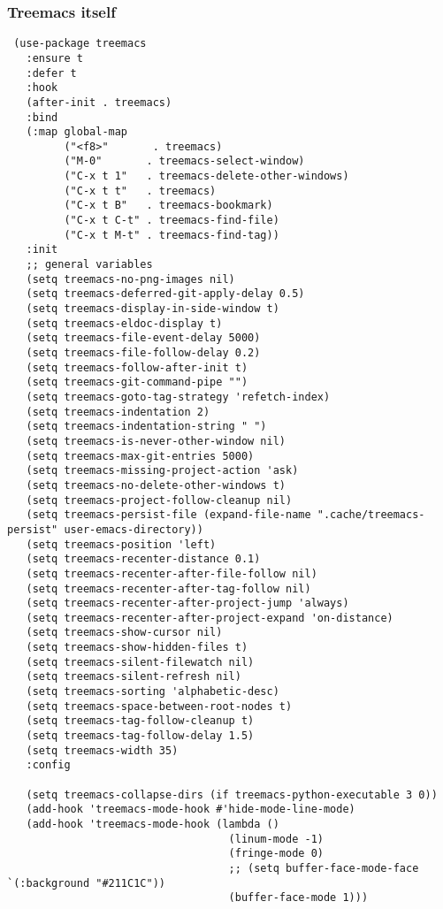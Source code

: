 \documentclass[11pt]{article}
\begin{document}
\subsubsection*{Treemacs itself}
\label{sec:orgd23273f}
\begin{verbatim}
 (use-package treemacs
   :ensure t
   :defer t
   :hook
   (after-init . treemacs)
   :bind
   (:map global-map
         ("<f8>"       . treemacs)
         ("M-0"       . treemacs-select-window)
         ("C-x t 1"   . treemacs-delete-other-windows)
         ("C-x t t"   . treemacs)
         ("C-x t B"   . treemacs-bookmark)
         ("C-x t C-t" . treemacs-find-file)
         ("C-x t M-t" . treemacs-find-tag))
   :init
   ;; general variables
   (setq treemacs-no-png-images nil)
   (setq treemacs-deferred-git-apply-delay 0.5)
   (setq treemacs-display-in-side-window t)
   (setq treemacs-eldoc-display t)
   (setq treemacs-file-event-delay 5000)
   (setq treemacs-file-follow-delay 0.2)
   (setq treemacs-follow-after-init t)
   (setq treemacs-git-command-pipe "")
   (setq treemacs-goto-tag-strategy 'refetch-index)
   (setq treemacs-indentation 2)
   (setq treemacs-indentation-string " ")
   (setq treemacs-is-never-other-window nil)
   (setq treemacs-max-git-entries 5000)
   (setq treemacs-missing-project-action 'ask)
   (setq treemacs-no-delete-other-windows t)
   (setq treemacs-project-follow-cleanup nil)
   (setq treemacs-persist-file (expand-file-name ".cache/treemacs-persist" user-emacs-directory))
   (setq treemacs-position 'left)
   (setq treemacs-recenter-distance 0.1)
   (setq treemacs-recenter-after-file-follow nil)
   (setq treemacs-recenter-after-tag-follow nil)
   (setq treemacs-recenter-after-project-jump 'always)
   (setq treemacs-recenter-after-project-expand 'on-distance)
   (setq treemacs-show-cursor nil)
   (setq treemacs-show-hidden-files t)
   (setq treemacs-silent-filewatch nil)
   (setq treemacs-silent-refresh nil)
   (setq treemacs-sorting 'alphabetic-desc)
   (setq treemacs-space-between-root-nodes t)
   (setq treemacs-tag-follow-cleanup t)
   (setq treemacs-tag-follow-delay 1.5)
   (setq treemacs-width 35)
   :config

   (setq treemacs-collapse-dirs (if treemacs-python-executable 3 0))
   (add-hook 'treemacs-mode-hook #'hide-mode-line-mode)
   (add-hook 'treemacs-mode-hook (lambda ()
                                   (linum-mode -1)
                                   (fringe-mode 0)
                                   ;; (setq buffer-face-mode-face `(:background "#211C1C"))
                                   (buffer-face-mode 1)))



\end{verbatim}
\end{document}
